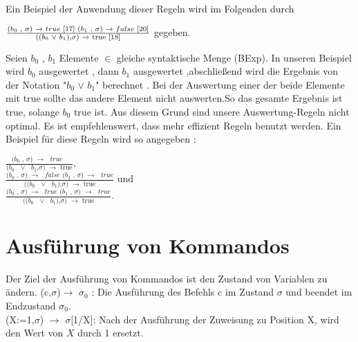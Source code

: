 \documentclass[a4paper,12pt,twoside,headsepline]{scrartcl}
\begin{document}
Ein Beispiel der Anwendung dieser Regeln wird im Folgenden durch \\
\begin{center}
$\frac  {\text {($b_0$ , $\sigma$) $\to$ $true$ $\ref{17}$   ($b_1$ , $\sigma$) $\to$ $false$ $\ref{20}$} } { \text{(($b_0$ $\vee$ $b_1$),$\sigma$) $\to$ true $\ref{18}$} }$ gegeben.\\
\end{center}
Seien $b_0$ , $b_1$ Elemente  $\in$ gleiche syntaktische Menge (BExp).
In unseren Beispiel wird $b_0$ ausgewertet , dann $b_1$ ausgewertet ,abschließend wird die Ergebnis von der Notation "$b_0$ $\vee$ $b_1$"  berechnet . 
Bei der Auswertung einer der beide Elemente mit true  sollte das andere Element nicht auswerten.So  das gesamte Ergebnis ist true, solange $b_0$ true ist. 
Aus diesem Grund sind unsere Auswertung-Regeln nicht optimal. 
Es ist empfehlenswert, dass mehr effizient Regeln benutzt werden.
Ein Beispiel für diese Regeln wird so angegeben :


\begin{center}

$\frac  {\text {($b_0$ , $\sigma$) $\to$ $true$ } } { \text{($b_0$ $\vee$ $b_1$,$\sigma$) $\to$ true} }$,\\
$\frac  {\text {($b_0$ , $\sigma$) $\to$ $false$   ($b_1$ , $\sigma$) $\to$ $true$} } { \text{(($b_0$ $\vee$ $b_1$),$\sigma$) $\to$ true} }$ und\\
$\frac  {\text {($b_0$ , $\sigma$) $\to$ $true$   ($b_1$ , $\sigma$) $\to$ $true$} } { \text{(($b_0$ $\vee$ $b_1$),$\sigma$) $\to$ true} }$.
\end{center}


\section{Ausführung von Kommandos}  
Der Ziel der Ausführung von Kommandos ist den Zustand von Variablen  zu ändern.
(c,$\sigma$)$\to$ $\sigma_0$ : Die Ausführung des Befehls c im Zustand $\sigma$ und  beendet im Endzustand $\sigma_0$.\\
(X:=1,$\sigma$) $\to$ $\sigma$[1/X]: Nach der Ausführung der Zuweisung zu Position X, wird den Wert von $X$ durch 1 ersetzt.
\end{document}
